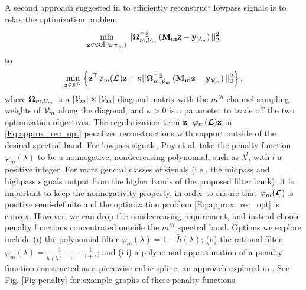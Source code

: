 \documentclass[journal, 10pt]{IEEEtran}
\begin{document}
A second approach suggested in \cite{PuyTGV15} to efficiently reconstruct lowpass signals is to relax the optimization problem
\begin{align*}
\min_{{\bf z} \in \hbox{col}({\bf U}_{{\cal R}_m})} ||{\boldsymbol \Omega}_{m,\V_m}^{-\frac{1}{2}}\left({\bf M_m z}-{{\bf y}_{\V_m}} \right) ||_2^2
\end{align*} 
to 
\begin{align}\label{Eq:approx_rec_opt}
\min_{{\bf z} \in \R^N} \left\{{\bf z}^{\top}\varphi_m(\L){\bf z} + \kappa ||{\boldsymbol \Omega}_{m,\V_m}^{-\frac{1}{2}}\left({\bf M_m z}-{{\bf y}_{\V_m}} \right) ||_2^2\right\},
\end{align} 
where ${\boldsymbol \Omega}_{m,{\mathcal{V}}_m}$ is a $|{\mathcal{V}}_m| \times |{\mathcal{V}}_m|$  diagonal matrix with the $m^{th}$ channel sampling weights of ${\mathcal{V}}_m$ along the diagonal, and $\kappa>0$ is a parameter to trade off the two optimization objectives. The regularization term ${\bf z}^{\top}\varphi_m(\boldsymbol{\mathcal{L}}){\bf z}$ in \eqref{Eq:approx_rec_opt} penalizes reconstructions with support outside of the desired spectral band. For lowpass signals, Puy et al. \cite{PuyTGV15} take the penalty function $\varphi_m(\lambda)$ to be a nonnegative, nondecreasing polynomial, such as $\lambda^l$, with $l$ a positive integer. For more general classes of signals (i.e., the midpass and highpass signals output from the higher bands of the proposed filter bank), it is important to keep the nonnegativity property, in order to ensure that $\varphi_m(\boldsymbol{\mathcal{L}})$ is positive semi-definite and the optimization problem \eqref{Eq:approx_rec_opt} is convex. However, we can drop the nondecreasing requirement, and instead choose penalty functions concentrated outside the $m^{th}$ spectral band. Options we explore include (i) the polynomial filter $\varphi_m(\lambda)=1-\tilde{h}(\lambda)$; (ii) the rational filter $\varphi_m(\lambda)=\frac{1}{\tilde{h}(\lambda)+\epsilon}-\frac{1}{1+\epsilon}$; 
and (iii) a polynomial approximation of a penalty function constructed as a piecewise cubic spline, an approach explored in \cite{chen_saad}. See Fig. \ref{Fig:penalty} for example graphs of these penalty functions.
\end{document}
